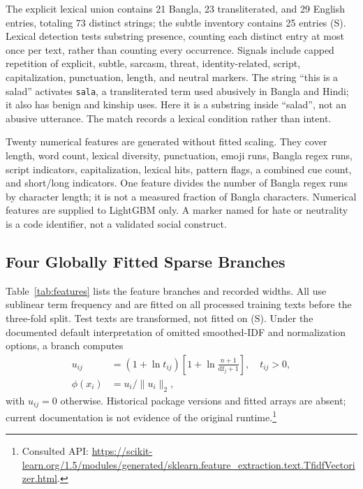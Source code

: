 \documentclass[doublecolumn]{ijcvsplatex}
\begin{document}
The explicit lexical union contains 21 Bangla, 23 transliterated, and 29 English entries, totaling 73 distinct strings; the subtle inventory contains 25 entries (S). Lexical detection tests substring presence, counting each distinct entry at most once per text, rather than counting every occurrence. Signals include capped repetition of explicit, subtle, sarcasm, threat, identity-related, script, capitalization, punctuation, length, and neutral markers. The string ``this is a salad'' activates \texttt{sala}, a transliterated term used abusively in Bangla and Hindi; it also has benign and kinship uses. Here it is a substring inside ``salad'', not an abusive utterance. The match records a lexical condition rather than intent.

Twenty numerical features are generated without fitted scaling. They cover length, word count, lexical diversity, punctuation, emoji runs, Bangla regex runs, script indicators, capitalization, lexical hits, pattern flags, a combined cue count, and short/long indicators. One feature divides the number of Bangla regex runs by character length; it is not a measured fraction of Bangla characters. Numerical features are supplied to LightGBM only. A marker named for hate or neutrality is a code identifier, not a validated social construct.

\subsection{Four Globally Fitted Sparse Branches}
Table~\ref{tab:features} lists the feature branches and recorded widths. All use sublinear term frequency and are fitted on all processed training texts before the three-fold split. Test texts are transformed, not fitted on (S). Under the documented default interpretation of omitted smoothed-IDF and normalization options, a branch computes
\begin{equation}
\begin{aligned}
u_{ij}&=(1+\ln t_{ij})\left[1+\ln\frac{n+1}{\mathrm{df}_j+1}\right],\quad t_{ij}>0,\\
\phi(x_i)&=u_i/\|u_i\|_2,
\end{aligned}
\end{equation}
with $u_{ij}=0$ otherwise. Historical package versions and fitted arrays are absent; current documentation is not evidence of the original runtime.\footnote{Consulted API: \url{https://scikit-learn.org/1.5/modules/generated/sklearn.feature_extraction.text.TfidfVectorizer.html}.}
\end{document}
